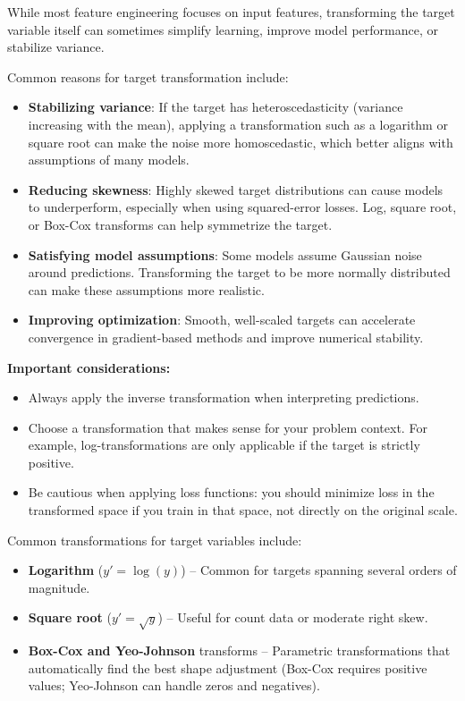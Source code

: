 \documentclass[12pt,openany, draft]{book}
\begin{document}
While most feature engineering focuses on input features, transforming the target variable itself can sometimes simplify learning, improve model performance, or stabilize variance.

Common reasons for target transformation include:
\begin{itemize}
    \item \textbf{Stabilizing variance}: If the target has heteroscedasticity (variance increasing with the mean), applying a transformation such as a logarithm or square root can make the noise more homoscedastic, which better aligns with assumptions of many models.
    \item \textbf{Reducing skewness}: Highly skewed target distributions can cause models to underperform, especially when using squared-error losses. Log, square root, or Box-Cox transforms can help symmetrize the target.
    \item \textbf{Satisfying model assumptions}: Some models assume Gaussian noise around predictions. Transforming the target to be more normally distributed can make these assumptions more realistic.
    \item \textbf{Improving optimization}: Smooth, well-scaled targets can accelerate convergence in gradient-based methods and improve numerical stability.
\end{itemize}

\textbf{Important considerations:}
\begin{itemize}
    \item Always apply the inverse transformation when interpreting predictions.
    \item Choose a transformation that makes sense for your problem context. For example, log-transformations are only applicable if the target is strictly positive.
    \item Be cautious when applying loss functions: you should minimize loss in the transformed space if you train in that space, not directly on the original scale.
\end{itemize}

Common transformations for target variables include:
\begin{itemize}
    \item \textbf{Logarithm} (\(y' = \log(y)\)) – Common for targets spanning several orders of magnitude.
    \item \textbf{Square root} (\(y' = \sqrt{y}\)) – Useful for count data or moderate right skew.
    \item \textbf{Box-Cox and Yeo-Johnson} transforms – Parametric transformations that automatically find the best shape adjustment (Box-Cox requires positive values; Yeo-Johnson can handle zeros and negatives).
\end{itemize}
\end{document}
